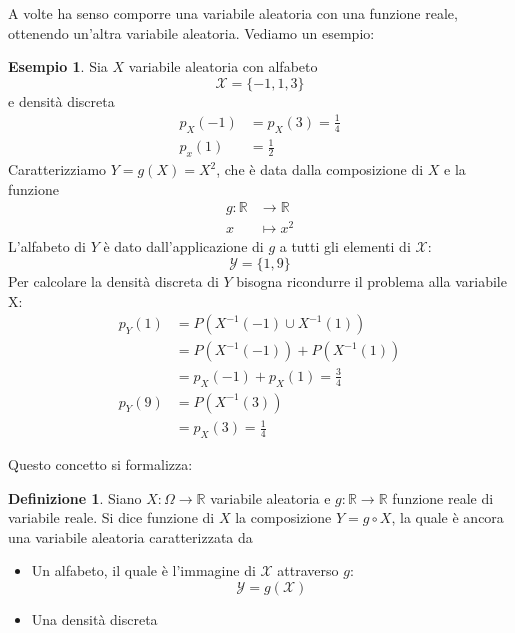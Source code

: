 \documentclass{article}
\theoremstyle{plain}
\theoremstyle{definition}
\newtheorem{definizione}{Definizione}[section]
\newtheorem{esempio}{Esempio}[section]
\theoremstyle{remark}
\begin{document}
A volte ha senso comporre una variabile aleatoria con una funzione reale, ottenendo un'altra variabile aleatoria. Vediamo un esempio:
\begin{esempio}
	Sia $X$ variabile aleatoria con alfabeto
	\begin{equation*}
		\mathcal{X}=\{-1,1,3\}
	\end{equation*}
	e densità discreta
	\begin{align*}
		p_X(-1)&=p_X(3)=\frac{1}{4}\\
		p_x(1)&=\frac{1}{2}
	\end{align*}
	Caratterizziamo $Y=g(X)=X^2$, che è data dalla composizione di $X$ e la funzione
	\begin{align*}
		g:\mathds{R}&\to\mathds{R}\\
		x&\mapsto x^2
	\end{align*}
	L'alfabeto di $Y$ è dato dall'applicazione di $g$ a tutti gli elementi di $\mathcal{X}$:
	\begin{equation*}
		\mathcal{Y}=\{1,9\}
	\end{equation*}
	Per calcolare la densità discreta di $Y$ bisogna ricondurre il problema alla variabile X:
	\begin{align*}
		p_Y(1)&=P(X^{-1}(-1)\cup X^{-1}(1))\\
		&=P(X^{-1}(-1))+P(X^{-1}(1))\\
		&=p_X(-1)+p_X(1)=\frac{3}{4}\\
		p_Y(9)&=P(X^{-1}(3))\\
		&=p_X(3)=\frac{1}{4}
	\end{align*}
\end{esempio}
Questo concetto si formalizza:
\begin{definizione}
	Siano $X:\Omega\to\mathds{R}$ variabile aleatoria e $g:\mathds{R}\to\mathds{R}$ funzione reale di variabile reale. Si dice funzione di $X$ la composizione $Y=g\circ X$, la quale è ancora una variabile aleatoria caratterizzata da
	\begin{itemize}
		\item Un alfabeto, il quale è l'immagine di $\mathcal{X}$ attraverso $g$:
		\begin{equation*}
			\mathcal{Y}=g(\mathcal{X})
		\end{equation*}
		\item Una densità discreta %
	\end{itemize}
\end{definizione}
\end{document}

